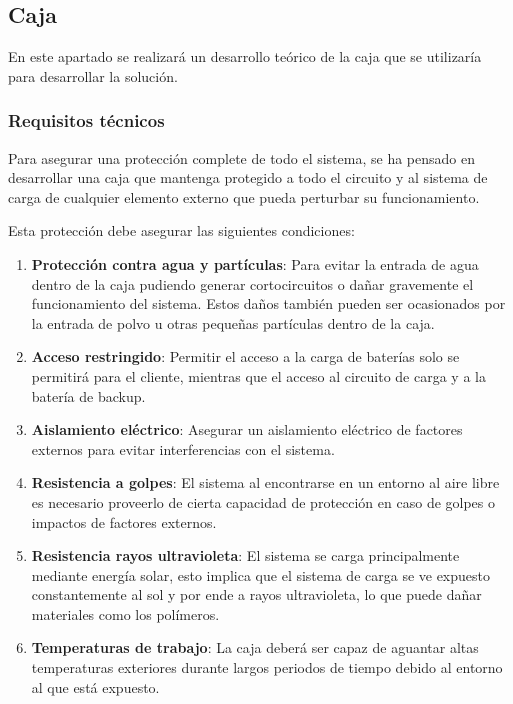 
\subsection{Caja}

En este apartado se realizará un desarrollo teórico de la caja que se utilizaría para desarrollar la solución.

\subsubsection{Requisitos técnicos}

Para asegurar una protección complete de todo el sistema, se ha pensado en desarrollar una caja que mantenga protegido a todo el circuito y al sistema de carga de cualquier elemento externo que pueda perturbar su funcionamiento.

Esta protección debe asegurar las siguientes condiciones:
\begin{enumerate}
    \item \textbf{Protección contra agua y partículas}: Para evitar la entrada de agua dentro de la caja pudiendo generar cortocircuitos o dañar gravemente el funcionamiento del sistema. Estos daños también pueden ser ocasionados por la entrada de polvo u otras pequeñas partículas dentro de la caja. 
    \item \textbf{Acceso restringido}: Permitir el acceso a la carga de baterías solo se permitirá para el cliente, mientras que el acceso al circuito de carga y a la batería de backup. 
    \item \textbf{Aislamiento eléctrico}: Asegurar un aislamiento eléctrico de factores externos para evitar interferencias con el sistema.
    \item \textbf{Resistencia a golpes}: El sistema al encontrarse en un entorno al aire libre es necesario proveerlo de cierta capacidad de protección en caso de golpes o impactos de factores externos.
    \item \textbf{Resistencia rayos ultravioleta}: El sistema se carga principalmente mediante energía solar, esto implica que el sistema de carga se ve expuesto constantemente al sol y por ende a rayos ultravioleta, lo que puede dañar materiales como los polímeros.
    \item \textbf{Temperaturas de trabajo}: La caja deberá ser capaz de aguantar altas temperaturas exteriores durante largos periodos de tiempo debido al entorno al que está expuesto.
\end{enumerate}


